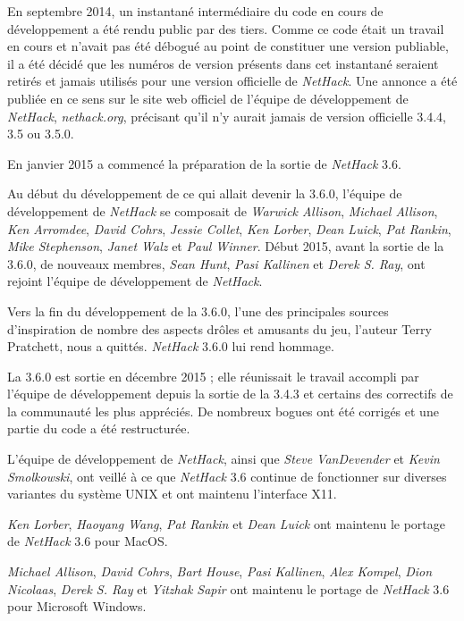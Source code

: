 \documentclass[titlepage]{article}
\begin{document}
\medskip
En septembre 2014, un instantané intermédiaire du code en cours de développement a été
rendu public par des tiers.
Comme ce code était un travail en cours
et n'avait pas été débogué au point de constituer une version publiable,
il a été décidé que les numéros de version présents dans cet instantané seraient
retirés et jamais utilisés pour une version officielle de \textit{NetHack}.
Une annonce a été publiée en ce sens sur le site web officiel de l'équipe de développement de \textit{NetHack},
\textit{nethack.org},
précisant qu'il n'y aurait jamais de version officielle 3.4.4, 3.5 ou
3.5.0.

\medskip
En janvier 2015 a commencé la préparation de la sortie de \textit{NetHack} 3.6.

\medskip
Au début du développement de ce qui allait devenir
la 3.6.0, l'équipe de développement de \textit{NetHack} se composait de \textit{Warwick Allison},
\textit{Michael Allison}, \textit{Ken Arromdee},
\textit{David Cohrs}, \textit{Jessie Collet},
\textit{Ken Lorber}, \textit{Dean Luick}, \textit{Pat Rankin},
\textit{Mike Stephenson}, \textit{Janet Walz} et \textit{Paul Winner}.
Début 2015, avant la sortie de la 3.6.0, de nouveaux membres,
\textit{Sean Hunt}, \textit{Pasi Kallinen} et \textit{Derek S. Ray},
ont rejoint l'équipe de développement de \textit{NetHack}.

\medskip
Vers la fin du développement de la 3.6.0, l'une des principales sources d'inspiration
de nombre des aspects drôles et amusants du jeu,
l'auteur Terry Pratchett, nous a quittés. \textit{NetHack} 3.6.0 lui rend
hommage.

\medskip
La 3.6.0 est sortie en décembre 2015 ; elle réunissait le travail accompli par l'équipe
de développement depuis la sortie de la 3.4.3 et certains des correctifs
de la communauté les plus appréciés.  De nombreux bogues ont été corrigés et une partie du code a été restructurée.

\medskip
L'équipe de développement de \textit{NetHack}, ainsi que \textit{Steve VanDevender} et
\textit{Kevin Smolkowski}, ont veillé à ce que \textit{NetHack} 3.6 continue de
fonctionner sur diverses variantes du système UNIX et ont maintenu l'interface X11.

\medskip
\textit{Ken Lorber}, \textit{Haoyang Wang}, \textit{Pat Rankin} et \textit{Dean Luick}
ont maintenu le portage de \textit{NetHack} 3.6 pour MacOS.

\medskip
\textit{Michael Allison}, \textit{David Cohrs}, \textit{Bart House},
\textit{Pasi Kallinen}, \textit{Alex Kompel}, \textit{Dion Nicolaas},
\textit{Derek S. Ray} et  \textit{Yitzhak Sapir}
ont maintenu le portage de  \textit{NetHack} 3.6 pour Microsoft Windows.
\end{document}
